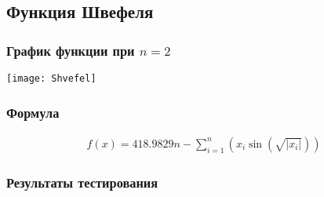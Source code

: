 \documentclass{article}
\begin{document}
    \subsection{Функция Швефеля}

    \subsubsection{График функции при $n=2$}
    \texttt{[image: Shvefel]}

    \subsubsection{Формула}
    \begin{gather*}
        f(x)=418.9829 n-\sum_{i=1}^n\left(x_i \sin \left(\sqrt{\left|x_i\right|}\right)\right)
    \end{gather*}

    \subsubsection{Результаты тестирования}
\end{document}
